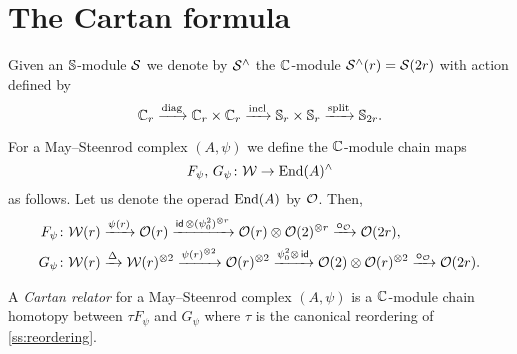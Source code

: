 
\section{The Cartan formula}\label{s:cartan}

Given an $\mathbb{S}$-module $\mathcal{S}$ we denote by $\mathcal{S}^\wedge$ the $\mathbb{C}$-module $\mathcal{S}^\wedge(r) = \mathcal{S}(2r)$ with
action defined by
\begin{equation}\label{eq:cyclic to 2-symetric}
	\mathbb{C}_r \xrightarrow{\mathrm{diag}}
	\mathbb{C}_r \times \mathbb{C}_r \xrightarrow{\mathrm{incl}}
	\mathbb{S}_r \times \mathbb{S}_r \xrightarrow{\mathrm{split}}
	\mathbb{S}_{2r}.
\end{equation}

For a May--Steenrod complex $(A,\psi)$ we define the $\mathbb{C}$-module chain maps
\[
F_\psi,\, G_\psi \colon \mathcal{W} \to \mathrm{End}(A)^\wedge
\]
as follows.
Let us denote the operad $\mathrm{End}(A)$ by $\mathcal{O}$.
Then,
\begin{align*}
	F_\psi \colon& \mathcal{W}(r) \xrightarrow{\psi(r)} \mathcal{O}(r) \xrightarrow{\mathsf{id}\, \otimes (\psi_0^2)^{\otimes r}}
	\mathcal{O}(r) \otimes \mathcal{O}(2)^{\otimes r} \xrightarrow{\bm{\circ}_{\mathcal{O}}}
	\mathcal{O}(2r), \\
	G_\psi \colon& \mathcal{W}(r) \xrightarrow{\Delta}
	\mathcal{W}(r)^{\otimes 2} \xrightarrow{\psi(r)^{\otimes 2}}
	\mathcal{O}(r)^{\otimes 2} \xrightarrow{\psi_0^2 \otimes\, \mathsf{id}}
	\mathcal{O}(2) \otimes \mathcal{O}(r)^{\otimes 2} \xrightarrow{\bm{\circ}_{\mathcal{O}}}
	\mathcal{O}(2r).
\end{align*}

\begin{definition}
	A \textit{Cartan relator} for a May--Steenrod complex $(A, \psi)$ is a $\mathbb{C}$-module chain homotopy between $\tau F_\psi$ and $G_\psi$ where $\tau$ is the canonical reordering of \cref{ss:reordering}.
\end{definition}

